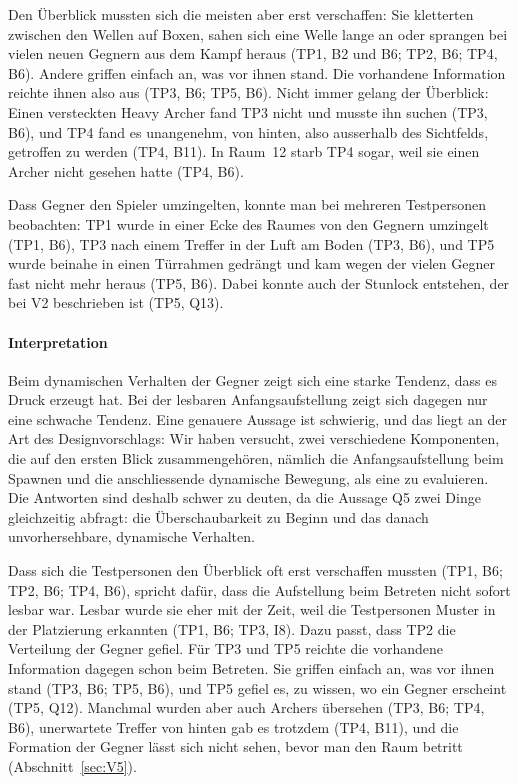 \documentclass[../Main.tex]{subfiles}
\begin{document}
Den Überblick mussten sich die meisten aber erst verschaffen: Sie kletterten zwischen den Wellen auf Boxen, sahen sich eine Welle lange an oder sprangen bei vielen neuen Gegnern aus dem Kampf heraus (TP1, B2 und B6; TP2, B6; TP4, B6). Andere griffen einfach an, was vor ihnen stand. Die vorhandene Information reichte ihnen also aus (TP3, B6; TP5, B6). Nicht immer gelang der Überblick: Einen versteckten Heavy Archer fand TP3 nicht und musste ihn suchen (TP3, B6), und TP4 fand es unangenehm, von hinten, also ausserhalb des Sichtfelds, getroffen zu werden (TP4, B11). In Raum~12 starb TP4 sogar, weil sie einen Archer nicht gesehen hatte (TP4, B6).

Dass Gegner den Spieler umzingelten, konnte man bei mehreren Testpersonen beobachten: TP1 wurde in einer Ecke des Raumes von den Gegnern umzingelt (TP1, B6), TP3 nach einem Treffer in der Luft am Boden (TP3, B6), und TP5 wurde beinahe in einen Türrahmen gedrängt und kam wegen der vielen Gegner fast nicht mehr heraus (TP5, B6). Dabei konnte auch der Stunlock entstehen, der bei V2 beschrieben ist (TP5, Q13).

\paragraph{Interpretation}
Beim dynamischen Verhalten der Gegner zeigt sich eine starke Tendenz, dass es Druck erzeugt hat. Bei der lesbaren Anfangsaufstellung zeigt sich dagegen nur eine schwache Tendenz. Eine genauere Aussage ist schwierig, und das liegt an der Art des Designvorschlags: Wir haben versucht, zwei verschiedene Komponenten, die auf den ersten Blick zusammengehören, nämlich die Anfangsaufstellung beim Spawnen und die anschliessende dynamische Bewegung, als eine zu evaluieren. Die Antworten sind deshalb schwer zu deuten, da die Aussage Q5 zwei Dinge gleichzeitig abfragt: die Überschaubarkeit zu Beginn und das danach unvorhersehbare, dynamische Verhalten.

Dass sich die Testpersonen den Überblick oft erst verschaffen mussten (TP1, B6; TP2, B6; TP4, B6), spricht dafür, dass die Aufstellung beim Betreten nicht sofort lesbar war. Lesbar wurde sie eher mit der Zeit, weil die Testpersonen Muster in der Platzierung erkannten (TP1, B6; TP3, I8). Dazu passt, dass TP2 die Verteilung der Gegner gefiel. Für TP3 und TP5 reichte die vorhandene Information dagegen schon beim Betreten. Sie griffen einfach an, was vor ihnen stand (TP3, B6; TP5, B6), und TP5 gefiel es, zu wissen, wo ein Gegner erscheint (TP5, Q12). Manchmal wurden aber auch Archers übersehen (TP3, B6; TP4, B6), unerwartete Treffer von hinten gab es trotzdem (TP4, B11), und die Formation der Gegner lässt sich nicht sehen, bevor man den Raum betritt (Abschnitt~\ref{sec:V5}).
\end{document}
